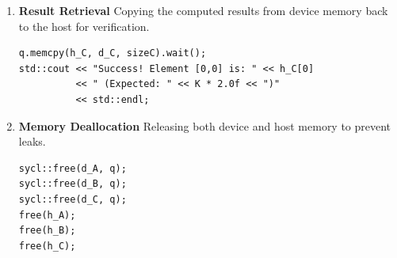 \begin{enumerate}
\begin{enumerate}
\begin{lstlisting}
// Dispatching the kernel using the functor instance
q.submit([&](sycl::handler& h) {
    MatrixMulFunctor functor(d_A, d_B, d_C, M, K, N);
    h.parallel_for(sycl::range<2>(M, N), functor);
}).wait();
\end{lstlisting}
    \end{enumerate}

    \item \textbf{Result Retrieval}
    Copying the computed results from device memory back to the host for verification.
\begin{lstlisting}
q.memcpy(h_C, d_C, sizeC).wait();
std::cout << "Success! Element [0,0] is: " << h_C[0]
          << " (Expected: " << K * 2.0f << ")"
          << std::endl;
\end{lstlisting}

    \item \textbf{Memory Deallocation}
    Releasing both device and host memory to prevent leaks.
\begin{lstlisting}
sycl::free(d_A, q);
sycl::free(d_B, q);
sycl::free(d_C, q);
free(h_A);
free(h_B);
free(h_C);
\end{lstlisting}
    
\end{enumerate}
